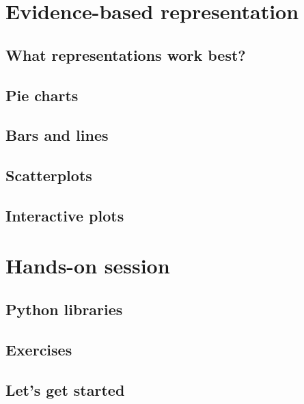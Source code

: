 \section{Evidence-based representation}
\subsection{What representations work best?}

\subsection{Pie charts}

\subsection{Bars and lines}

\subsection{Scatterplots}

\subsection{Interactive plots}


\section{Hands-on session}
\subsection{Python libraries}

\subsection{Exercises}

\subsection{Let's get started}



%

%



